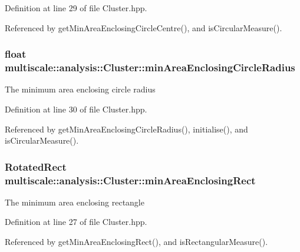Definition at line 29 of file Cluster.\-hpp.



Referenced by get\-Min\-Area\-Enclosing\-Circle\-Centre(), and is\-Circular\-Measure().

\hypertarget{classmultiscale_1_1analysis_1_1Cluster_a070994481884a4c7f5aa4879ce7b0568}{
\subsubsection[{min\-Area\-Enclosing\-Circle\-Radius}]{\setlength{\rightskip}{0pt plus 5cm}float multiscale\-::analysis\-::\-Cluster\-::min\-Area\-Enclosing\-Circle\-Radius\hspace{0.3cm}{\ttfamily [private]}}}\label{classmultiscale_1_1analysis_1_1Cluster_a070994481884a4c7f5aa4879ce7b0568}
The minimum area enclosing circle radius 

Definition at line 30 of file Cluster.\-hpp.



Referenced by get\-Min\-Area\-Enclosing\-Circle\-Radius(), initialise(), and is\-Circular\-Measure().

\hypertarget{classmultiscale_1_1analysis_1_1Cluster_aeb032303a79c6bd43385fcaad9c50742}{
\subsubsection[{min\-Area\-Enclosing\-Rect}]{\setlength{\rightskip}{0pt plus 5cm}Rotated\-Rect multiscale\-::analysis\-::\-Cluster\-::min\-Area\-Enclosing\-Rect\hspace{0.3cm}{\ttfamily [private]}}}\label{classmultiscale_1_1analysis_1_1Cluster_aeb032303a79c6bd43385fcaad9c50742}
The minimum area enclosing rectangle 

Definition at line 27 of file Cluster.\-hpp.



Referenced by get\-Min\-Area\-Enclosing\-Rect(), and is\-Rectangular\-Measure().

